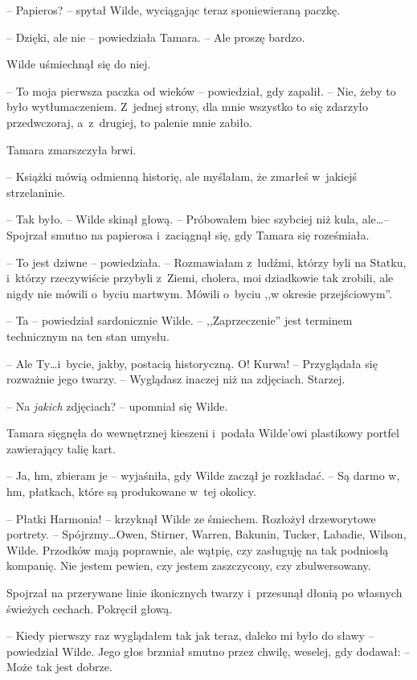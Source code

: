 \documentclass[oneside,polish,11pt,sfheadings]{mwbk}
\begin{document}
-- Papieros? -- spytał Wilde, wyciągając teraz sponiewieraną paczkę.

-- Dzięki, ale nie -- powiedziała Tamara. -- Ale proszę bardzo.

Wilde uśmiechnął się do niej. 

-- To moja pierwsza paczka od wieków -- powiedział, gdy zapalił. -- Nie, żeby to było wytłumaczeniem. Z~jednej
strony, dla mnie wszystko to się zdarzyło przedwczoraj, a~z~drugiej, to
palenie mnie zabiło.

Tamara zmarszczyła brwi. 

-- Książki mówią odmienną historię, ale
myślałam, że zmarłeś w~jakiejś strzelaninie.

-- Tak było. -- Wilde skinął głową. -- Próbowałem biec szybciej niż kula,
ale\ldots -- Spojrzał smutno na papierosa i~zaciągnął się, gdy Tamara się
roześmiała.

-- To jest dziwne -- powiedziała. -- Rozmawiałam z~ludźmi, którzy byli na
Statku, i~którzy rzeczywiście przybyli z~Ziemi, cholera, moi dziadkowie
tak zrobili, ale nigdy nie mówili o~byciu martwym. Mówili o~byciu ,,w
okresie przejściowym''.

-- Ta -- powiedział sardonicznie Wilde. -- ,,Zaprzeczenie'' jest terminem
technicznym na ten stan umysłu.

-- Ale Ty\ldots i~bycie, jakby, postacią historyczną. O! Kurwa! -- Przyglądała się rozważnie jego twarzy. -- Wyglądasz inaczej niż na
zdjęciach. Starzej.

-- Na \emph{jakich} zdjęciach? -- upomniał się Wilde.

Tamara sięgnęła do wewnętrznej kieszeni i~podała Wilde'owi plastikowy
portfel zawierający talię kart.

-- Ja, hm, zbieram je -- wyjaśniła, gdy Wilde zaczął je rozkładać. -- Są
darmo w, hm, płatkach, które są produkowane w~tej okolicy.

-- Płatki Harmonia! -- krzyknął Wilde ze śmiechem. Rozłożył drzeworytowe
portrety. -- Spójrzmy\ldots Owen, Stirner, Warren, Bakunin, Tucker, Labadie,
Wilson, Wilde. Przodków mają poprawnie, ale wątpię, czy zasługuję na tak
podniosłą kompanię. Nie jestem pewien, czy jestem zaszczycony, czy
zbulwersowany.

Spojrzał na przerywane linie ikonicznych twarzy i~przesunął dłonią po
własnych świeżych cechach. Pokręcił głową.

-- Kiedy pierwszy raz wyglądałem tak jak teraz, daleko mi było do sławy -- powiedział Wilde. Jego głos brzmiał smutno przez chwilę, weselej, gdy
dodawał: -- Może tak jest dobrze.
\end{document}
